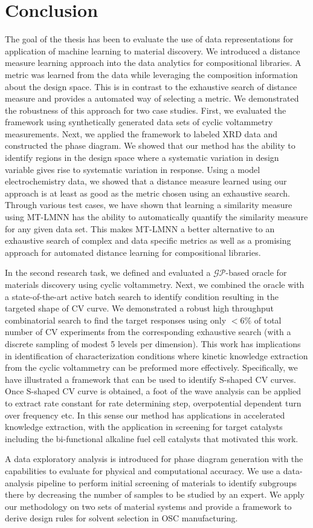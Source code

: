 \chapter{Conclusion}
The goal of the thesis has been to evaluate the use of data representations for application of machine learning to material discovery.
We introduced a distance measure learning approach into the data analytics for compositional libraries. 
A metric was learned from the data while leveraging the composition information about the design space. 
This is in contrast to the exhaustive search of distance measure and provides a automated way of selecting a metric.
We demonstrated the robustness of this approach for two case studies. 
First, we evaluated the framework using synthetically generated data sets of cyclic voltammetry measurements. 
Next, we applied the framework to labeled XRD data and constructed the phase diagram.
We showed that our method has the ability to identify regions in the design space where a systematic variation in design variable gives rise to systematic variation in response. 
Using a model electrochemistry data, we showed that a distance measure learned using our approach is at least as good as the metric chosen using an exhaustive search.
Through various test cases, we have shown that learning a similarity measure using MT-LMNN has the ability to automatically quantify the similarity measure for any given data set. This makes MT-LMNN a better alternative to an exhaustive search of complex and data specific metrics as well as a promising approach for automated distance learning for compositional libraries. 


In the second research task, we defined and evaluated a \(\mathcal{GP}\)-based oracle for materials discovery using cyclic voltammetry.
Next, we combined the oracle with a state-of-the-art active batch search to identify condition resulting in the targeted shape of CV curve. 
We demonstrated a robust high throughput combinatorial search to find the target responses using only \(<6\%\) of total number of CV experiments from the corresponding exhaustive search (with a discrete sampling of modest 5 levels per dimension). 
This work has implications in identification of characterization conditions where kinetic knowledge extraction from the cyclic voltammetry can be preformed more effectively. 
Specifically, we have illustrated a framework that can be used to identify S-shaped CV curves. 
Once S-shaped CV curve is obtained, a foot of the wave analysis can be applied ~\cite{FOWA} to extract rate constant for rate determining step, overpotential dependent turn over frequency etc.
In this sense our method has applications in accelerated knowledge extraction, with the application in screening for target catalysts including the bi-functional alkaline fuel cell catalysts that motivated this work.


A data exploratory analysis is introduced for phase diagram generation with the capabilities to evaluate for physical and computational accuracy. 
We use a data-analysis pipeline to perform initial screening of materials to identify subgroups there by decreasing the number of samples to be studied by an expert.
We apply our methodology on two sets of material systems and provide a framework to derive design rules for solvent selection in OSC manufacturing.